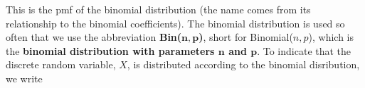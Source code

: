  	\bigskip
	
	\hfil{}
	\bigskip
	\bigskip

\noindent This is the pmf of the binomial distribution (the name comes from its relationship to the binomial coefficients). The binomial distribution is used so often that we use the abbreviation \textbf{Bin($\boldsymbol{n,p}$)}, short for Binomial($n,p$), which is the \textbf{binomial distribution with parameters $\boldsymbol{n}$ and $\boldsymbol{p}$}. To indicate that the discrete random variable, $X$, is distributed according to the binomial disribution, we write \label{Bin(n,p)}

  	\bigskip
	
	\hfil{}
	\bigskip
	\bigskip

